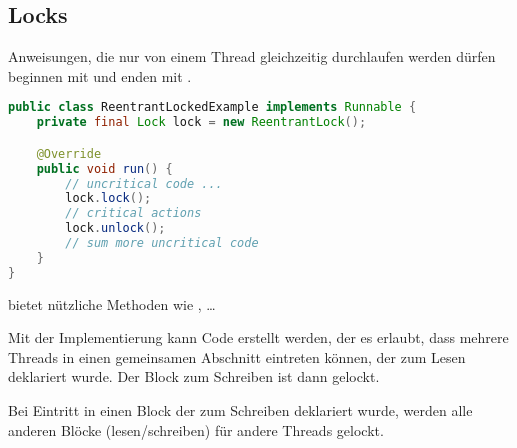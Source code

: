 \subsection{Locks}
Anweisungen, die nur von einem Thread gleichzeitig durchlaufen werden dürfen beginnen mit  und enden mit .

\begin{lstlisting}[language=Java]
public class ReentrantLockedExample implements Runnable {
	private final Lock lock = new ReentrantLock();

	@Override
	public void run() {  
		// uncritical code ...
		lock.lock();
		// critical actions
		lock.unlock();
		// sum more uncritical code
	}
}	
\end{lstlisting}

 bietet nützliche Methoden wie , \dots
 
%     

Mit der Implementierung  kann Code erstellt werden, der es erlaubt, dass mehrere Threads in einen gemeinsamen Abschnitt eintreten können, der zum Lesen deklariert wurde. Der Block zum Schreiben ist dann gelockt.

Bei Eintritt in einen Block der zum Schreiben deklariert wurde, werden alle anderen Blöcke (lesen/schreiben) für andere Threads gelockt.

